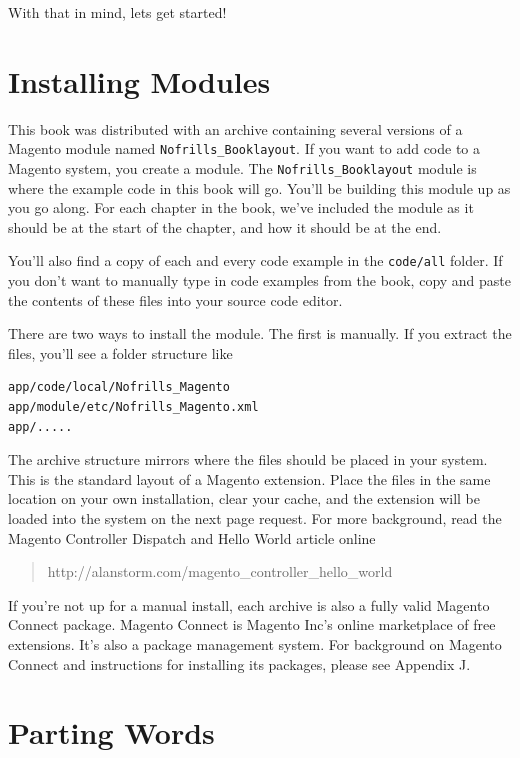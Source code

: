 \documentclass[oneside]{book}
\begin{document}
With that in mind, lets get started!

\section{Installing Modules}

This book was distributed with an archive containing several versions of a Magento module named \footnotesize\texttt{Nofrills\_Booklayout}\normalsize.  If you want to add code to a Magento system, you create a module.  The \footnotesize\texttt{Nofrills\_Booklayout} \normalsize  module is where the example code in this book will go.  You'll be building this module up as you go along.  For each chapter in the book, we've included the module as it should be at the start of the chapter, and how it should be at the end.  

You'll also find a copy of each and every code example in the \footnotesize\texttt{code/all} \normalsize  folder. If you don't want to manually type in code examples from the book, copy and paste the contents of these files into your source code editor. 

There are two ways to install the module.  The first is manually.  If you extract the files, you'll see a folder structure like

\begin{lstlisting}
app/code/local/Nofrills_Magento
app/module/etc/Nofrills_Magento.xml
app/.....

\end{lstlisting}


The archive structure mirrors where the files should be placed in your system.  This is the standard layout of a Magento extension.  Place the files in the same location on your own installation, clear your cache, and the extension will be loaded into the system on the next page request. For more background, read the Magento Controller Dispatch and Hello World article online

\begin{quote}
http://alanstorm.com/magento\_controller\_hello\_world
\end{quote}

If you're not up for a manual install, each archive is also a fully valid Magento Connect package.  Magento Connect is Magento Inc's online marketplace of free extensions.  It's also a package management system.  For background on Magento Connect and instructions for installing its packages, please see Appendix J.

\section{Parting Words}
\end{document}
